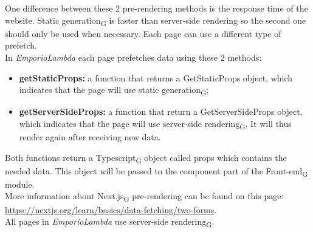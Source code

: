 One difference between these 2 pre-rendering methods is the response time of the website.
Static generation\textsubscript{G} is faster than server-side rendering so the second one should only be used when necessary. Each page can use a different type of prefetch.\\
In \textit{EmporioLambda} each page prefetches data using these 2 methods:
\begin{itemize}
\item \textbf{getStaticProps:} a function that returns a GetStaticProps object, which indicates that the page will use static generation\textsubscript{G};
\item \textbf{getServerSideProps:} a function that return a GetServerSideProps object, which indicates that the page will use server-side rendering\textsubscript{G}. It will thus render again after receiving new data.
\end{itemize}
Both functions return a Typescript\textsubscript{G} object called props which contains the needed data. This object will be passed to the component part of the Front-end\textsubscript{G} module.\\
More information about Next.js\textsubscript{G} pre-rendering can be found on this page:\\
\url{https://nextjs.org/learn/basics/data-fetching/two-forms}.\\
All pages in \textit{EmporioLambda} use server-side rendering\textsubscript{G}.